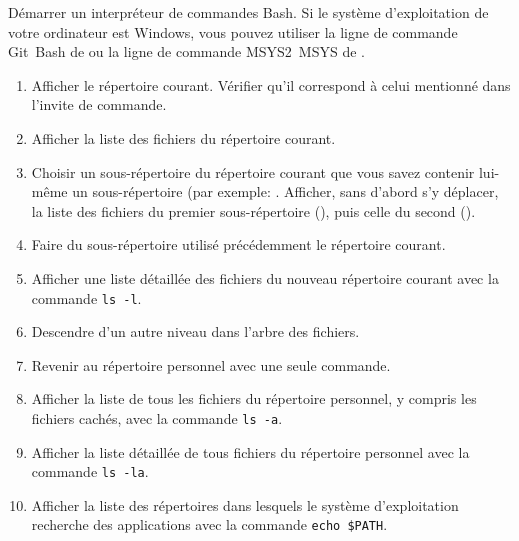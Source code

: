 \begin{exercice}[nosol]
  Démarrer un interpréteur de commandes Bash. Si le système
  d'exploitation de votre ordinateur est Windows, vous pouvez utiliser
  la ligne de commande Git~Bash de
   ou la
  ligne de commande MSYS2~MSYS de
  .
  \begin{enumerate}
  \item Afficher le répertoire courant. Vérifier qu'il correspond à
    celui mentionné dans l'invite de commande.
  \item Afficher la liste des fichiers du répertoire courant.
  \item Choisir un sous-répertoire du répertoire courant que vous
    savez contenir lui-même un sous-répertoire (par exemple:
    . Afficher, sans d'abord s'y déplacer, la
    liste des fichiers du premier sous-répertoire (),
    puis celle du second ().
  \item Faire du sous-répertoire utilisé précédemment le répertoire
    courant.
  \item Afficher une liste détaillée des fichiers du nouveau
    répertoire courant avec la commande \verb=ls -l=.
  \item Descendre d'un autre niveau dans l'arbre des fichiers.
  \item Revenir au répertoire personnel avec une seule commande.
  \item Afficher la liste de tous les fichiers du répertoire
    personnel, y compris les fichiers cachés, avec la commande
    \verb=ls -a=.
  \item Afficher la liste détaillée de tous fichiers du répertoire
    personnel avec la commande \verb=ls -la=.
  \item Afficher la liste des répertoires dans lesquels le système
    d'exploitation recherche des applications avec la commande
    \verb=echo $PATH=.
  \end{enumerate}
\end{exercice}


